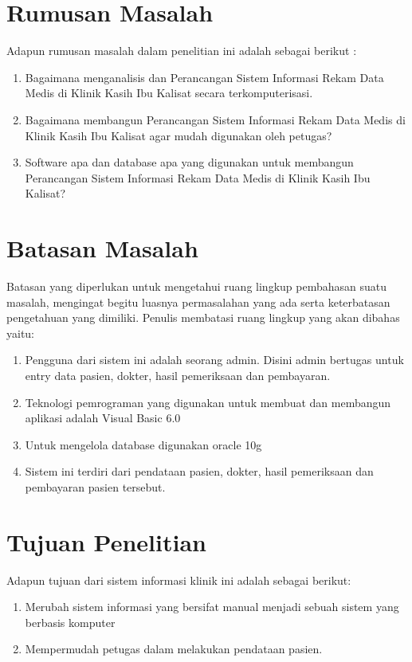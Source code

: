 \documentclass{jtetiproposalskripsi}
\begin{document}
\section{Rumusan Masalah}
Adapun rumusan masalah dalam penelitian ini adalah sebagai berikut :
\begin{enumerate}
\item Bagaimana menganalisis dan Perancangan Sistem Informasi Rekam Data Medis di Klinik Kasih Ibu Kalisat secara terkomputerisasi.
\item Bagaimana membangun Perancangan Sistem Informasi Rekam Data Medis di Klinik Kasih Ibu Kalisat agar mudah digunakan oleh petugas?
\item Software apa dan database apa yang digunakan untuk  membangun Perancangan Sistem Informasi Rekam Data Medis di Klinik Kasih Ibu Kalisat?
\end{enumerate}

\section{Batasan Masalah}
Batasan yang diperlukan untuk mengetahui ruang lingkup pembahasan suatu masalah, mengingat begitu luasnya permasalahan yang ada serta keterbatasan pengetahuan yang dimiliki. Penulis membatasi ruang lingkup yang akan dibahas yaitu:
\begin{enumerate}
\item Pengguna dari sistem ini adalah seorang admin. Disini admin bertugas untuk entry data pasien, dokter, hasil pemeriksaan dan pembayaran. 
\item Teknologi pemrograman yang digunakan untuk membuat dan membangun aplikasi adalah Visual Basic 6.0
\item Untuk mengelola database digunakan oracle 10g 
\item Sistem ini terdiri dari pendataan pasien, dokter, hasil pemeriksaan dan pembayaran pasien tersebut.
\end{enumerate}

\section{Tujuan Penelitian}
Adapun tujuan dari sistem informasi klinik ini adalah sebagai berikut:
\begin{enumerate}
\item Merubah sistem informasi yang bersifat manual menjadi sebuah sistem yang berbasis komputer
\item Mempermudah petugas dalam melakukan pendataan pasien.

\end{enumerate}
\end{document}
